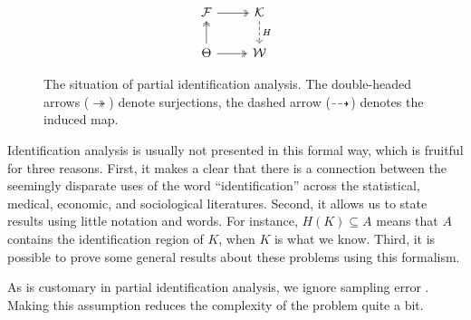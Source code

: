 \begin{figure}
\noindent \begin{centering}
\[
\begin{tikzcd}
\mathcal{F} \arrow[twoheadrightarrow]{r} & \mathcal{K} \arrow[dashed]{d}{H} \\
\Theta      \arrow[twoheadrightarrow]{u} \arrow[twoheadrightarrow]{r}  & \mathcal{W}
\end{tikzcd}
\]
\par\end{centering}
\caption{\label{fig:partial identifiaction situation-1}The situation of partial
identification analysis. The double-headed arrows ($\twoheadrightarrow$)
denote surjections, the dashed arrow ($\protect\dashrightarrow$)
denotes the induced map.}
\end{figure}

Identification analysis is usually not presented in this formal way, which is fruitful for three reasons. First, it makes a clear that there is a connection between the seemingly disparate uses of the word ``identification'' across the statistical, medical, economic, and sociological literatures.
Second, it allows us to state results using little notation and words. For instance, $H(K)\subseteq A$ means that $A$ contains the identification region of $K$, when $K$ is what we know. Third, it is possible to prove some general results about these problems using this formalism.

As is customary in partial identification analysis, we ignore sampling error \parencite{Manski2003-aq}. Making this assumption reduces the complexity of the problem quite a bit. 

